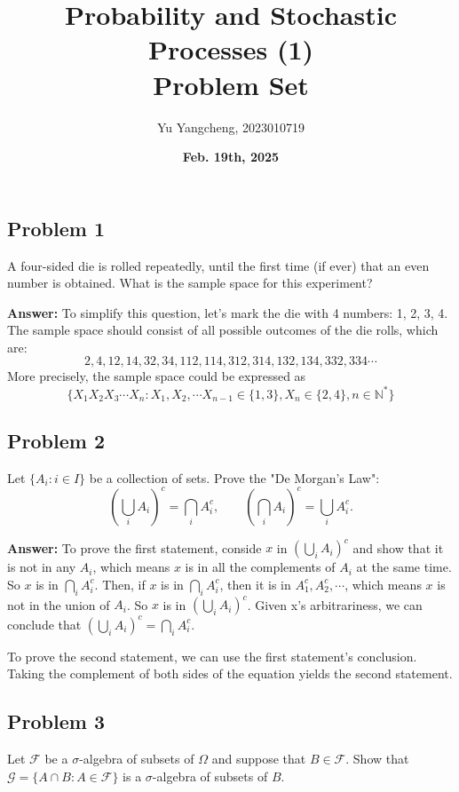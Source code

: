 \documentclass[12pt]{article}
\title{Probability and Stochastic Processes (1) \\ Problem Set}
\date{\textbf{Feb. 19th, 2025}}
\author{ Yu Yangcheng, 2023010719}
\begin{document}
\maketitle

\subsection*{Problem 1}
A four-sided die is rolled repeatedly, until the first time (if ever) that an even number is obtained. What is the sample space for this experiment?

\textbf{Answer:} 
To simplify this question, let's mark the die with 4 numbers: 1, 2, 3, 4. The sample space should consist of all possible outcomes of the die rolls, which are: 
$$
{2,4,12,14,32,34,112,114,312,314,132,134,332,334\cdots}
$$
More precisely, the sample space could be expressed as
$$
\{X_1X_2X_3\cdots X_n : X_1, X_2, \cdots X_{n-1} \in \{1, 3\}, X_n \in \{2, 4\}, n \in \mathbb{N}^*\}
$$
\subsection*{Problem 2}
Let $\{A_{i}:i\in I\}$ be a collection of sets. Prove the "De Morgan's Law":
\[
\left(\bigcup_{i}A_{i}\right)^{c}=\bigcap_{i}A_{i}^{c},\qquad\left(\bigcap_{i}A_{i}\right)^{c}=\bigcup_{i}A_{i}^{c}.
\]

\textbf{Answer:} 
To prove the first statement, conside \(x\) in \(\left(\bigcup_{i}A_{i}\right)^{c}\) and show that it is not in any $A_{i}$, which means \(x\) is in all the complements of $A_{i}$ at the same time. So $x$ is in $\bigcap_{i}A_{i}^{c}$.
Then, if $x$ is in $\bigcap_{i}A_{i}^{c}$, then it is in $A_1^c,A_2^c,\cdots$, which means $x$ is not in the union of $A_{i}$. So $x$ is in $\left(\bigcup_{i}A_{i}\right)^{c}$. Given x's arbitrariness, we can conclude that $\left(\bigcup_{i}A_{i}\right)^{c}=\bigcap_{i}A_{i}^{c}$. 

To prove the second statement, we can use the first statement's conclusion. Taking the complement of both sides of the equation yields the second statement.

\subsection*{Problem 3}
Let $\mathcal{F}$ be a $\sigma$-algebra of subsets of $\Omega$ and suppose that $B\in\mathcal{F}$. Show that $\mathcal{G}=\{A\cap B:A\in\mathcal{F}\}$ is a $\sigma$-algebra of subsets of $B$.
\end{document}
